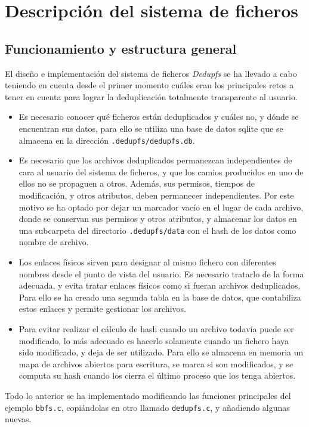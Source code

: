 \documentclass[12pt,a4paper]{article}
\begin{document}
\newpage
\section{Descripción del sistema de ficheros}

\subsection{Funcionamiento y estructura general}

El diseño e implementación del sistema de ficheros \emph{Dedupfs} se ha llevado a cabo teniendo en cuenta desde el primer momento cuáles eran los principales retos a tener en cuenta para lograr la deduplicación totalmente transparente al usuario.
\begin{itemize}
 \item Es necesario conocer qué ficheros están deduplicados y cuáles no, y dónde se encuentran sus datos, para ello se utiliza una base de datos sqlite que se almacena en la dirección \texttt{\small .dedupfs/dedupfs.db}.
 \item Es necesario que los archivos deduplicados permanezcan independientes de cara al usuario del sistema de ficheros, y que los camios producidos en uno de ellos no se propaguen a otros. Además, sus permisos, tiempos de modificación, y otros atributos, deben permanecer independientes. Por este motivo se ha optado por dejar un marcador vacío en el lugar de cada archivo, donde se conservan sus permisos y otros atributos, y almacenar los datos en una subcarpeta del directorio \texttt{\small .dedupfs/data} con el hash de los datos como nombre de archivo.
 \item Los enlaces físicos sirven para designar al mismo fichero con diferentes nombres desde el punto de vista del usuario. Es necesario tratarlo de la forma adecuada, y evita tratar enlaces físicos como si fueran archivos deduplicados. Para ello se ha creado una segunda tabla en la base de datos, que contabiliza estos enlaces y permite gestionar los archivos.
 \item Para evitar realizar el cálculo de hash cuando un archivo todavía puede ser modificado, lo más adecuado es hacerlo solamente cuando un fichero haya sido modificado, y deja de ser utilizado. Para ello se almacena en memoria un mapa de archivos abiertos para escritura, se marca si son modificados, y se computa su hash cuando los cierra el último proceso que los tenga abiertos.
\end{itemize}

Todo lo anterior se ha implementado modificando las funciones principales del ejemplo \texttt{\small bbfs.c}, copiándolas en otro llamado \texttt{\small dedupfs.c}, y añadiendo algunas nuevas.
\end{document}
